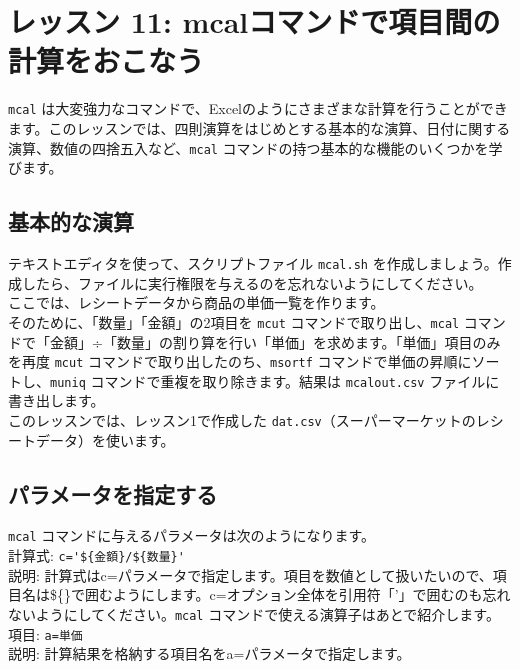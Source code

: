 

%

\section{レッスン 11: mcalコマンドで項目間の計算をおこなう}

\verb|mcal| は大変強力なコマンドで、Excelのようにさまざまな計算を行うことができます。このレッスンでは、四則演算をはじめとする基本的な演算、日付に関する演算、数値の四捨五入など、\verb|mcal| コマンドの持つ基本的な機能のいくつかを学びます。

\subsection{基本的な演算}

テキストエディタを使って、スクリプトファイル \verb|mcal.sh| を作成しましょう。作成したら、ファイルに実行権限を与えるのを忘れないようにしてください。\\

ここでは、レシートデータから商品の単価一覧を作ります。\\

そのために、「数量」「金額」の2項目を \verb|mcut| コマンドで取り出し、\verb|mcal| コマンドで「金額」÷「数量」の割り算を行い「単価」を求めます。「単価」項目のみを再度 \verb|mcut| コマンドで取り出したのち、\verb|msortf| コマンドで単価の昇順にソートし、\verb|muniq| コマンドで重複を取り除きます。結果は \verb|mcalout.csv| ファイルに書き出します。\\

このレッスンでは、レッスン1で作成した \verb|dat.csv|（スーパーマーケットのレシートデータ）を使います。

\subsection{パラメータを指定する}

{\setlength{\parindent}{0cm}

\verb|mcal| コマンドに与えるパラメータは次のようになります。\\

計算式: \verb|c='${金額}/${数量}'| \\
説明: 計算式はc=パラメータで指定します。項目を数値として扱いたいので、項目名は\$\{\}で囲むようにします。c=オプション全体を引用符「'」で囲むのも忘れないようにしてください。\verb|mcal| コマンドで使える演算子はあとで紹介します。\\

項目: \verb|a=単価| \\
説明: 計算結果を格納する項目名をa=パラメータで指定します。\\
}

